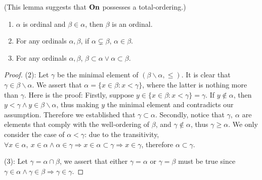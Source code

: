 \begin{lemma}
  \label{lemma 1.1.3}
  (This lemma suggests that $\boldsymbol{\mathrm{On}}$ possesses a total-ordering.)
  \begin{enumerate}
    \item $\alpha$ is ordinal and $\beta \in \alpha$, then $\beta$ is an ordinal.
    \item For any ordinals $\alpha, \beta$, if $\alpha \subsetneq \beta$, $\alpha \in \beta$.
    \item For any ordinals $\alpha, \beta$, $\beta \subset \alpha \vee \alpha \subset \beta$.
  \end{enumerate}
\end{lemma}
\begin{proof}
  (2): Let $\gamma$ be the minimal element of $(\beta \smallsetminus \alpha, \leq)$. It is clear that $\gamma \in \beta \smallsetminus \alpha$. We assert that $\alpha = \{ x \in \beta : x < \gamma \}$, where the latter is nothing more than $\gamma$. Here is the proof: Firstly, suppose $y \in \{ x \in \beta : x < \gamma \} = \gamma$. If $y \notin \alpha$, then $y < \gamma \wedge y \in \beta \smallsetminus \alpha$, thus making $y$ the minimal element and contradicts our assumption. Therefore we established that $\gamma \subset \alpha$. Secondly, notice that $\gamma, \ \alpha$ are elements that comply with the well-ordering of $\beta$, and $\gamma \notin \alpha$, thus $\gamma \geq \alpha$. 
  We only consider the case of $\alpha < \gamma$: due to the transitivity, $\forall x \in \alpha ,\ x\in \alpha \wedge \alpha \in \gamma \Rightarrow x \in \alpha \subset \gamma \Rightarrow x \in \gamma$, therefore $\alpha \subset \gamma$.

  (3): Let $\gamma = \alpha \cap \beta$, 
  we assert that either $\gamma = \alpha$ or $\gamma = \beta$ must be true since $\gamma \in \alpha \wedge \gamma \in \beta \Rightarrow \gamma \in \gamma$.
\end{proof}








